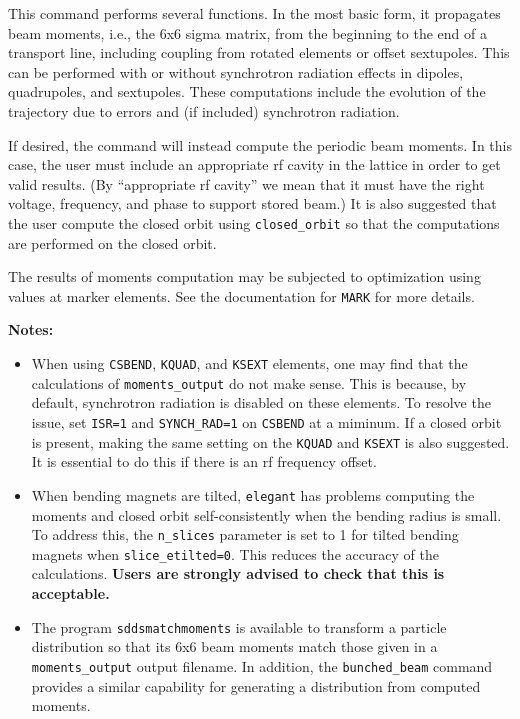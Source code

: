 \documentclass[11pt]{article}
\begin{document}
This command performs several functions.  In the most basic form, it
propagates beam moments, i.e., the 6x6 sigma matrix, from the
beginning to the end of a transport line, including coupling from
rotated elements or offset sextupoles. This can be performed with or
without synchrotron radiation effects in dipoles, quadrupoles, and sextupoles.
These computations
include the evolution of the trajectory due to errors and (if included)
synchrotron radiation.

If desired, the command will instead compute the periodic beam
moments.  In this case, the user must include an appropriate rf cavity
in the lattice in order to get valid results.  (By ``appropriate rf
cavity'' we mean that it must have the right voltage, frequency, and
phase to support stored beam.)  It is also suggested that the user
compute the closed orbit using \verb|closed_orbit| so that the
computations are performed on the closed orbit.

The results of moments computation may be subjected to optimization
using values at marker elements.  See the documentation for
\verb|MARK| for more details.

{\bf Notes:} 
\begin{itemize}
\item  When using \verb|CSBEND|, \verb|KQUAD|, and \verb|KSEXT| elements, one may find that the 
calculations of \verb|moments_output| do not make sense. This is because, by default, synchrotron
radiation is disabled on these elements. To resolve the issue, set \verb|ISR=1| and \verb|SYNCH_RAD=1|
on  \verb|CSBEND| at a miminum. If a closed orbit is present, making the same setting on 
the  \verb|KQUAD| and \verb|KSEXT| is also suggested. It is essential to do this if there is
an rf frequency offset.
\item When bending magnets are tilted, \verb|elegant| has problems computing the moments and
closed orbit self-consistently when the bending radius is small.  To address this, the \verb|n_slices| parameter is set to 1 for
tilted bending magnets when \verb|slice_etilted=0|. This reduces the accuracy of the calculations.
{\bf Users are strongly advised to check that this is acceptable.} 
\item The program \verb|sddsmatchmoments| is available to transform a particle distribution so that its 6x6 beam moments
  match those given in a \verb|moments_output| output filename. 
  In addition, the \verb|bunched_beam| command provides a similar capability for generating a distribution from computed
  moments.
\end{itemize}
\end{document}
